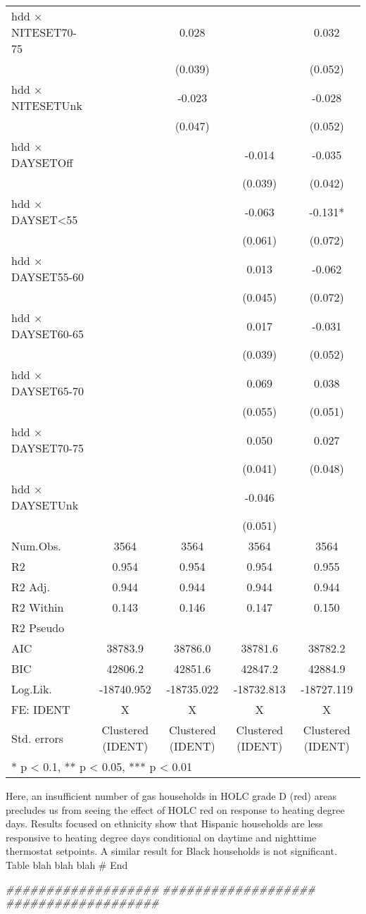\documentclass[
]{article}
\newenvironment{Shaded}{\begin{snugshade}}{\end{snugshade}}
\newcommand{\CommentTok}[1]{\textcolor[rgb]{0.56,0.35,0.01}{\textit{#1}}}
\begin{document}
\begin{table}[H]
\begin{tabular}[t]{lcccc}
hdd × NITESET70-75 &  & 0.028 &  & 0.032\\
 &  & (0.039) &  & (0.052)\\
hdd × NITESETUnk &  & -0.023 &  & -0.028\\
 &  & (0.047) &  & (0.052)\\
hdd × DAYSETOff &  &  & -0.014 & -0.035\\
 &  &  & (0.039) & (0.042)\\
hdd × DAYSET<55 &  &  & -0.063 & -0.131*\\
 &  &  & (0.061) & (0.072)\\
hdd × DAYSET55-60 &  &  & 0.013 & -0.062\\
 &  &  & (0.045) & (0.072)\\
hdd × DAYSET60-65 &  &  & 0.017 & -0.031\\
 &  &  & (0.039) & (0.052)\\
hdd × DAYSET65-70 &  &  & 0.069 & 0.038\\
 &  &  & (0.055) & (0.051)\\
hdd × DAYSET70-75 &  &  & 0.050 & 0.027\\
 &  &  & (0.041) & (0.048)\\
hdd × DAYSETUnk &  &  & -0.046 & \\
 &  &  & (0.051) & \\
\midrule
Num.Obs. & 3564 & 3564 & 3564 & 3564\\
R2 & 0.954 & 0.954 & 0.954 & 0.955\\
R2 Adj. & 0.944 & 0.944 & 0.944 & 0.944\\
R2 Within & 0.143 & 0.146 & 0.147 & 0.150\\
R2 Pseudo &  &  &  & \\
AIC & 38783.9 & 38786.0 & 38781.6 & 38782.2\\
BIC & 42806.2 & 42851.6 & 42847.2 & 42884.9\\
Log.Lik. & -18740.952 & -18735.022 & -18732.813 & -18727.119\\
FE: IDENT & X & X & X & X\\
Std. errors & Clustered (IDENT) & Clustered (IDENT) & Clustered (IDENT) & Clustered (IDENT)\\
\bottomrule
\multicolumn{5}{l}{\textsuperscript{} * p < 0.1, ** p < 0.05, *** p < 0.01}\\
\end{tabular}
\end{table}

Here, an insufficient number of gas households in HOLC grade D (red)
areas precludes us from seeing the effect of HOLC red on response to
heating degree days. Results focused on ethnicity show that Hispanic
households are less responsive to heating degree days conditional on
daytime and nighttime thermostat setpoints. A similar result for Black
households is not significant. Table blah blah blah \# End

\begin{Shaded}
\begin{Highlighting}[]
\CommentTok{###################}
\CommentTok{###################}
\CommentTok{###################}
\end{Highlighting}
\end{Shaded}
\end{document}
